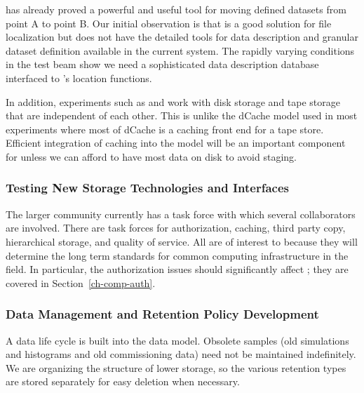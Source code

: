  has already proved a powerful and useful tool for moving defined datasets from point A to point B.  Our initial observation is that  is a good solution for file localization but does not have the detailed tools for data description and granular dataset definition available in the current  system.  The rapidly varying conditions in the test beam show we need a sophisticated data description database interfaced to 's location functions. 

In addition,  experiments such as  and  work with disk storage and tape storage that are independent of each other.  This is unlike the dCache model used in most  experiments where most of dCache is a caching front end for a tape store.  Efficient integration of caching into the  model will be an important component for  unless we can afford to have most data on disk to avoid staging.



\subsubsection{Testing New Storage Technologies and Interfaces}

The larger  community\cite{Berzano:2018xaa} currently has a  task force
 with which several  collaborators are involved. There are task forces for authorization, caching, third party copy, hierarchical storage, and quality of service. All are of interest to  because they will determine the long term standards for common computing infrastructure in the field. 
In particular, the authorization issues should significantly affect ; they are covered in Section~\ref{ch-comp-auth}.


\subsubsection{Data Management and Retention Policy Development}



A data life cycle is built into the  data model.  Obsolete samples (old simulations and histograms and old commissioning data) need not be maintained indefinitely.  
We are organizing the structure of lower storage, so the various retention types are stored separately for easy deletion when necessary.  

